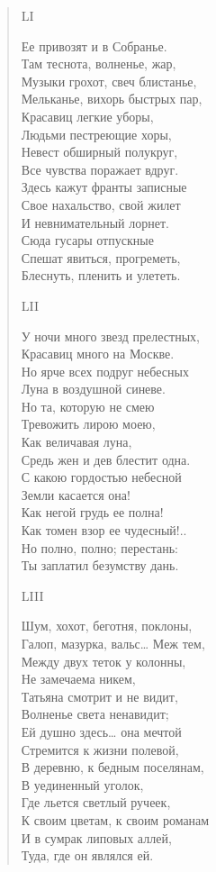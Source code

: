 \begin{verse}
LI

Ее привозят и в Собранье.\\
Там теснота, волненье, жар,\\
Музыки грохот, свеч блистанье,\\
Мельканье, вихорь быстрых пар,\\
Красавиц легкие уборы,\\
Людьми пестреющие хоры,\\
Невест обширный полукруг,\\
Все чувства поражает вдруг.\\
Здесь кажут франты записные\\
Свое нахальство, свой жилет\\
И невнимательный лорнет.\\
Сюда гусары отпускные\\
Спешат явиться, прогреметь,\\
Блеснуть, пленить и улететь.

LII

У ночи много звезд прелестных,\\
Красавиц много на Москве.\\
Но ярче всех подруг небесных\\
Луна в воздушной синеве.\\
Но та, которую не смею\\
Тревожить лирою моею,\\
Как величавая луна,\\
Средь жен и дев блестит одна.\\
С какою гордостью небесной\\
Земли касается она!\\
Как негой грудь ее полна!\\
Как томен взор ее чудесный!..\\
Но полно, полно; перестань:\\
Ты заплатил безумству дань.

LIII

Шум, хохот, беготня, поклоны,\\
Галоп, мазурка, вальс… Меж тем,\\
Между двух теток у колонны,\\
Не замечаема никем,\\
Татьяна смотрит и не видит,\\
Волненье света ненавидит;\\
Ей душно здесь… она мечтой\\
Стремится к жизни полевой,\\
В деревню, к бедным поселянам,\\
В уединенный уголок,\\
Где льется светлый ручеек,\\
К своим цветам, к своим романам\\
И в сумрак липовых аллей,\\
Туда, где он являлся ей.


\end{verse}
